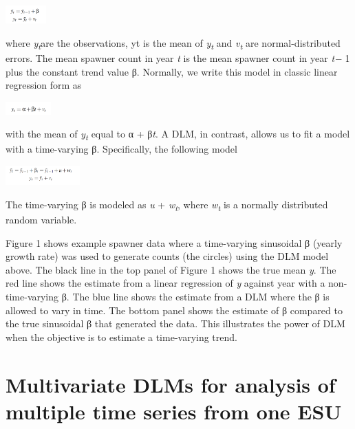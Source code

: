 \documentclass[
  letterpaper,
  oneside,
  open=any]{scrbook}
\begin{document}
\includegraphics[width=0.61in,height=\textheight]{content/../media/image1.png}

where \emph{y\textsubscript{t}}are the observations, yt is the mean of
\emph{y\textsubscript{t}} and \emph{v\textsubscript{t}} are
normal-distributed errors. The mean spawner count in year \emph{t} is
the mean spawner count in year \emph{t−} 1 plus the constant trend value
β. Normally, we write this model in classic linear regression form as

\includegraphics[width=0.69in,height=\textheight]{content/../media/image2.png}

with the mean of \emph{y\textsubscript{t}} equal to α + β\emph{t}. A
DLM, in contrast, allows us to fit a model with a time-varying β.
Specifically, the following model

\includegraphics[width=1.13in,height=\textheight]{content/../media/image3.png}

The time-varying β is modeled as \emph{u} + \emph{w\textsubscript{t}},
where \emph{w\textsubscript{t}} is a normally distributed random
variable.

Figure 1 shows example spawner data where a time-varying sinusoidal β
(yearly growth rate) was used to generate counts (the circles) using the
DLM model above. The black line in the top panel of Figure 1 shows the
true mean \emph{y}. The red line shows the estimate from a linear
regression of \emph{y} against year with a non-time-varying β. The blue
line shows the estimate from a DLM where the β is allowed to vary in
time. The bottom panel shows the estimate of β compared to the true
sinusoidal β that generated the data. This illustrates the power of DLM
when the objective is to estimate a time-varying trend.

\hypertarget{multivariate-dlms-for-analysis-of-multiple-time-series-from-one-esu}{%
\section{Multivariate DLMs for analysis of multiple time series from one
ESU}\label{multivariate-dlms-for-analysis-of-multiple-time-series-from-one-esu}}
\end{document}
